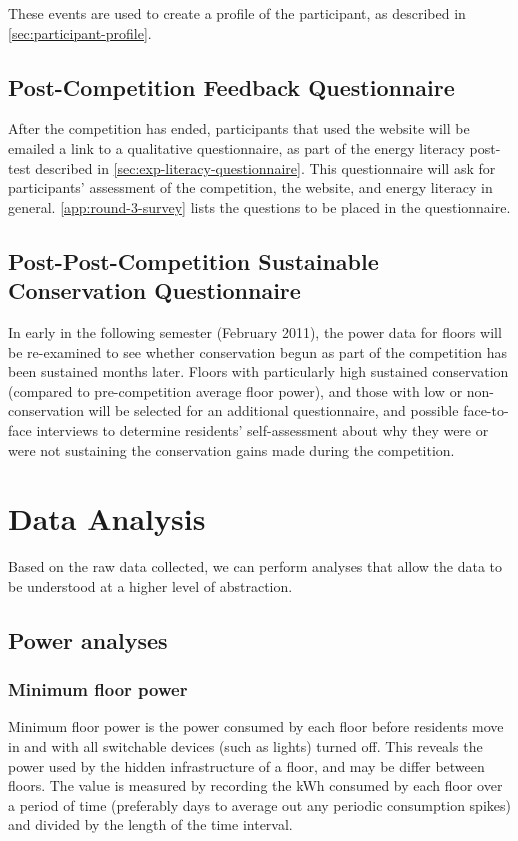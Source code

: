 These events are used to create a profile of the participant, as described in \autoref{sec:participant-profile}.

\subsection{Post-Competition Feedback Questionnaire}
\label{sec:post-competition-feedback}
After the competition has ended, participants that used the website will be emailed a link to a qualitative questionnaire, as part of the energy literacy post-test described in \autoref{sec:exp-literacy-questionnaire}. This questionnaire will ask for participants' assessment of the competition, the website, and energy literacy in general. \autoref{app:round-3-survey} lists the questions to be placed in the questionnaire.

\subsection{Post-Post-Competition Sustainable Conservation Questionnaire}

In early in the following semester (February 2011), the power data for floors will be re-examined to see whether conservation begun as part of the competition has been sustained months later. Floors with particularly high sustained conservation (compared to pre-competition average floor power), and those with low or non-conservation will be selected for an additional questionnaire, and possible face-to-face interviews to determine residents' self-assessment about why they were or were not sustaining the conservation gains made during the competition.

\section{Data Analysis}

Based on the raw data collected, we can perform analyses that allow the data to be understood at a higher level of abstraction.

\subsection{Power analyses}

\subsubsection{Minimum floor power}
\label{sec:min-floor-power}
Minimum floor power is the power consumed by each floor before residents move in and with all switchable devices (such as lights) turned off. This reveals the power used by the hidden infrastructure of a floor, and may be differ between floors. The value is measured by recording the kWh consumed by each floor over a period of time (preferably days to average out any periodic consumption spikes) and divided by the length of the time interval.

